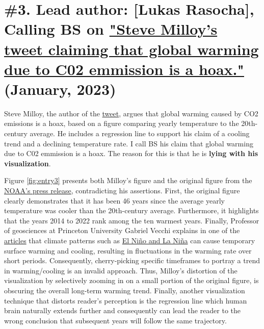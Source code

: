 \documentclass[fleqn,12pt]{article}
\begin{document}
\section{\#3. Lead author: [Lukas Rasocha], Calling BS on \href{https://twitter.com/JunkScience/status/1613724250011242497?s=20}{"Steve Milloy's tweet claiming that global warming due to C02 emmission is a hoax."} (January, 2023)} 

Steve Milloy, the author of the \href{https://twitter.com/JunkScience/status/1613724250011242497?s=20}{tweet}, argues that global warming caused by CO2 emissions is a hoax, 
based on a figure comparing yearly temperature to the 20th-century average. He includes a regression line to support his claim of a cooling trend and a declining temperature rate.
I call BS his claim that global warming due to C02 emmission is a hoax. The reason for this is that he is \textbf{lying with his visualization}. 

Figure \ref{fig:entry3} presents both Milloy's figure and the original figure from the \href{https://www.noaa.gov/news/2022-was-worlds-6th-warmest-year-on-record}{NOAA's press release}, 
contradicting his assertions. First, the original figure clearly demonstrates that it has been 46 years since the average yearly temperature was cooler than the 20th-century average. 
Furthermore, it highlights that the years 2014 to 2022 rank among the ten warmest years. Finally, Professor of geosciences at Princeton University Gabriel Vecchi explains in one of the \href{https://www.factcheck.org/2023/01/scicheck-viral-tweet-misrepresents-noaa-report-on-rising-global-temperature/}{articles} 
that climate patterns such as \href{https://oceanservice.noaa.gov/facts/ninonina.html}{El Niño and La Niña} can cause temporary surface warming and cooling, resulting in fluctuations in the warming rate over short periods. 
Consequently, cherry-picking specific timeframes to portray a trend in warming/cooling is an invalid approach. Thus, Milloy's distortion of the visualization by selectively zooming in on a small portion of the original figure, is obscuring 
the overall long-term warming trend. Finally, another visualization technique that distorts reader's perception is the regression line which human brain naturally extends further and consequently can lead the reader to the wrong conclusion that 
subsequent years will follow the same trajectory. 
\end{document}
